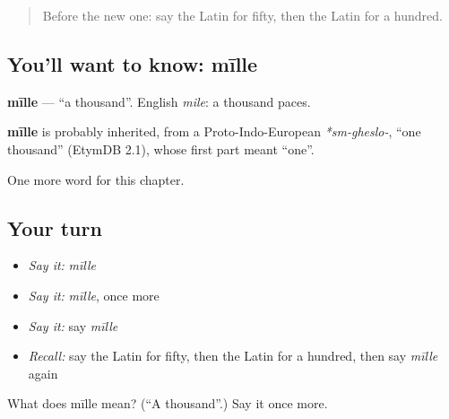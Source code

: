 \begin{quote}
Before the new one: say the Latin for fifty, then the Latin for a hundred.
\end{quote}

\subsection*{You'll want to know: mīlle}
\textbf{mīlle} — \textquotedblleft{}a thousand\textquotedblright{}. English \emph{mile}: a thousand paces.

\begin{cousinweb}
\textbf{mīlle} is probably inherited, from a Proto-Indo-European \emph{*sm-gheslo-}, \textquotedblleft{}one thousand\textquotedblright{} (EtymDB 2.1), whose first part meant \textquotedblleft{}one\textquotedblright{}.
\end{cousinweb}

\begin{grammarlens}[title={What you've built}]
One more word for this chapter.
\end{grammarlens}

\subsection*{Your turn}
\begin{itemize}
\raggedright
  \item \emph{Say it:} \emph{mīlle}
  \item \emph{Say it:} \emph{mīlle}, once more
  \item \emph{Say it:} say \emph{mīlle}
  \item \emph{Recall:} say the Latin for fifty, then the Latin for a hundred, then say \emph{mīlle} again
\end{itemize}

\begin{tcolorbox}[breakable,colback=teal!4,colframe=teal!35!black,title={Before you move on}]
What does mīlle mean? (\textquotedblleft{}A thousand\textquotedblright{}.) Say it once more.
\end{tcolorbox}
